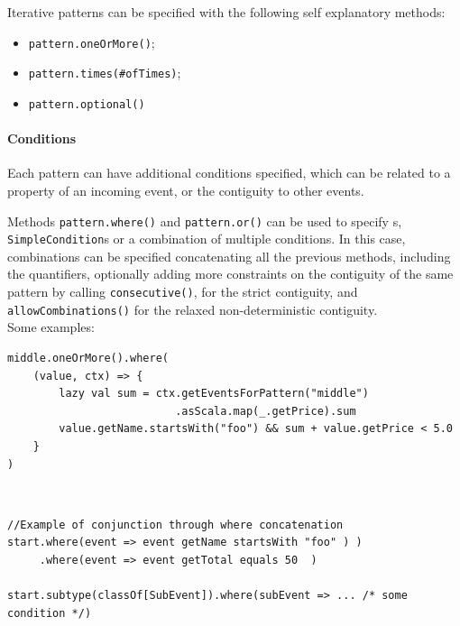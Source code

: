 Iterative patterns can be specified with the following self explanatory methods:

\begin{itemize}
    \item \texttt{pattern.oneOrMore()};
    \item \texttt{pattern.times(\#ofTimes)};
    \item \texttt{pattern.optional()}
\end{itemize}

\paragraph{Conditions}

Each pattern can have additional conditions specified, which can be related to a property of an incoming event, or the contiguity to other events.

Methods \texttt{pattern.where()} and \texttt{pattern.or()} can be used to specify \texttt{}s, \texttt{SimpleCondition}s or a combination of multiple conditions. In this case, combinations can be specified concatenating all the previous methods, including the quantifiers, optionally adding more constraints on the contiguity of the same pattern by calling \texttt{consecutive()}, for the strict contiguity, and \texttt{allowCombinations()} for the relaxed non-deterministic contiguity.
\\
Some examples:
\\
\begin{code}
\label{code:iterative-cond}
\begin{verbatim}
middle.oneOrMore().where(
    (value, ctx) => {
        lazy val sum = ctx.getEventsForPattern("middle")
                          .asScala.map(_.getPrice).sum
        value.getName.startsWith("foo") && sum + value.getPrice < 5.0
    }
)
\end{verbatim}
\end{code}~\\

\begin{code}
    \label{code:simple-cond}
    \begin{verbatim}
//Example of conjunction through where concatenation
start.where(event => event getName startsWith "foo" ) )
     .where(event => event getTotal equals 50  )

start.subtype(classOf[SubEvent]).where(subEvent => ... /* some condition */)
    \end{verbatim}
\end{code}~\\


